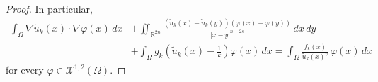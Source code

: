 \documentclass[10pt,a4paper]{amsart}
\def \N {\mathbb{N}}
\def \R {\mathbb{R}}
\def \XX {\mathcal{X}}
\begin{document}
\begin{proof}
In particular,
\begin{equation}\label{weakapprox}
\begin{split}
\int_\Omega\nabla \tilde u_k(x)\cdot\nabla\varphi(x)\,dx&+\iint_{\R^{2n}}\frac{(\tilde u_k(x)-\tilde u_k(y))(\varphi(x)-\varphi(y))}{|x-y|^{n+2s}}\,dx\,dy\\&+\int_\Omega g_k\left(\tilde u_k(x)-\frac 1 k\right)\varphi(x) \,dx
=\int_{\Omega}\frac{f_k(x)}{\tilde u_k(x)^{\gamma}}\,\varphi(x)\,dx
\end{split}
\end{equation}
for every $\varphi\in \XX^{1,2}(\Omega)$.

\vspace{0.2cm}


\end{proof}
\end{document}
